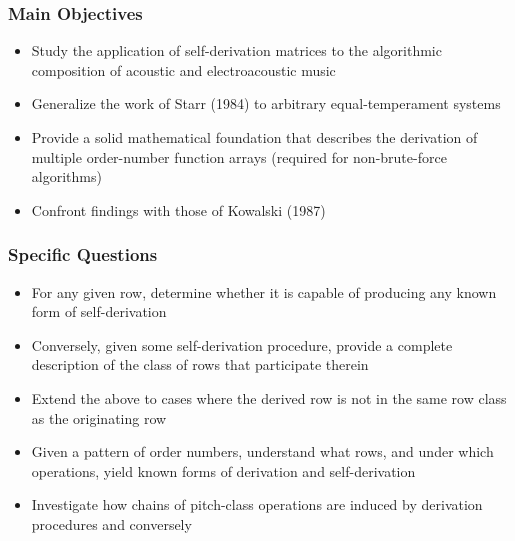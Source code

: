 
\begin{frame}
	\frametitle{Main Objectives}
	\begin{itemize}
		\item Study the application of self-derivation matrices to the algorithmic composition of acoustic and electroacoustic music
		\item Generalize the work of Starr (1984) to arbitrary equal-temperament systems
		\item Provide a solid mathematical foundation that describes the derivation of multiple order-number function arrays (required for non-brute-force algorithms)
		\item Confront findings with those of Kowalski (1987)
	\end{itemize}
\end{frame}

\begin{frame}
	\frametitle{Specific Questions}
	\begin{itemize}
		\item For any given row, determine whether it is capable of producing any known form of self-derivation
		\item Conversely, given some self-derivation procedure, provide a complete description of the class of rows that participate therein
		\item Extend the above to cases where the derived row is not in the same row class as the originating row
		\item Given a pattern of order numbers, understand what rows, and under which operations, yield known forms of derivation and self-derivation
		\item Investigate how chains of pitch-class operations are induced by derivation procedures and conversely
	\end{itemize}
\end{frame}

